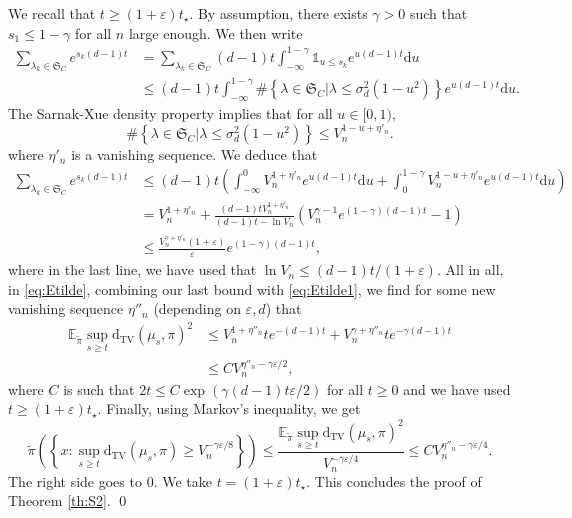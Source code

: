 \documentclass[]{scrartcl}
\newcommand{\DTV}{\mathrm{d_{TV}}}
\newcommand{\E}{\mathbb{E}}
\renewcommand{\d}{\mathrm{d}}
\numberwithin{equation}{section}
\numberwithin{figure}{section}
\begin{document}
We recall that $t \geq (1+\varepsilon)t_\star$. By assumption, there exists $\gamma > 0$ such that $s_1 \leq 1- \gamma$ for all $n$ large enough. We then write
\begin{align*}
	\sum_{ \lambda_k \in \mathfrak S_C } e^{s_{k} (d-1) t} & =  \sum_{\lambda_k \in \mathfrak S_C} (d-1)  t \int_{-\infty}^{1-\gamma} \mathds{1}_{u \leq s_{k}} e^{u(d-1)t}\d u
	\\&\leq (d-1) t\int_{-\infty}^{1-\gamma} \# \left\lbrace \lambda \in \mathfrak S_C \vert \lambda \leq \sigma_d^2 (1-u^2)\right\rbrace e^{u(d-1)t}
	\d u.
\end{align*}
The Sarnak-Xue density property implies that for all $u\in [0,1)$,
$$
\# \left\lbrace \lambda \in \mathfrak S_C \vert \lambda \leq \sigma_d^2 (1-u^2)\right\rbrace \leq V_n^{1-u + \eta'_n}.
$$
where $\eta'_n$ is a vanishing sequence. We deduce that
\begin{align*}
	\sum_{ \lambda_k \in \mathfrak S_C } e^{s_{k} (d-1) t}  &\leq (d-1) t  \left( \int_{-\infty}^0  V_n^{1 + \eta'_n} e^{u(d-1)t} \d u  + \int_{0}^{1  - \gamma}  V_n^{1-u+\eta'_n} e^{u(d-1)t } \d u \right)
	\\& =  V_n^{1 + \eta'_n} + \frac{(d-1) t V_n^{1 + \eta'_n}}{(d-1) t - \ln V_n}  \left( V_n^{\gamma-1} e^{(1-\gamma)(d-1)t} - 1\right)\\
	& \leq \frac{V_n^{\gamma + \eta'_n}(1+\varepsilon)}{\varepsilon}  e^{(1-\gamma)(d-1)t}, 
\end{align*}		
where in the last line, we have used that $\ln V_n \leq (d-1) t/(1+\varepsilon)$. 
All in all, in \eqref{eq:Etilde}, combining our last bound with \eqref{eq:Etilde1}, we find for some new vanishing sequence $\eta''_n$ (depending on $\varepsilon,d$) that
\begin{align*}
	\E_{\widetilde\pi} \sup_{s \geq t} \DTV\left( \mu_s, \pi\right)^2 &\leq V_n^{1+\eta''_n} t e^{-(d-1)t}  + V_n^{\gamma+\eta''_n}  t e^{-\gamma (d-1)t} \\
	& \leq  C V_n^{\eta''_n -\gamma \varepsilon/2}, 
\end{align*}
where $C$ is such that $2 t \leq C \exp ( \gamma (d-1) t   \varepsilon /2)$ for all $t \geq 0$ and we have used $t \geq (1+\varepsilon) t_\star$. Finally, using Markov's inequality, we get
\[\widetilde\pi  \left(\left\{ x :   \sup_{s \geq t} \DTV(\mu_s,\pi) \geq V_n^{-\gamma \varepsilon / 8} \right\}  \right) 
\leq \frac{ \E_{\widetilde\pi} \sup_{s \geq t} \DTV \left( \mu_s, \pi\right)^2}{V_n^{-\gamma \varepsilon / 4} }
\leq   C V_n^{\eta''_n -\gamma \varepsilon /4}.
\]
The right side goes to $0$. We take $t = (1+\varepsilon)t_\star$. This concludes the proof of Theorem \ref{th:S2}. \qed
\end{document}
